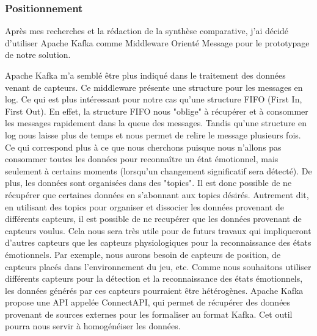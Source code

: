 \documentclass[11pt]{article}
\begin{document}
		\subsubsection{Positionnement}\label{sec:position}
			Après mes recherches et la rédaction de la synthèse comparative, j'ai décidé d'utiliser Apache Kafka comme Middleware Orienté Message pour le prototypage de notre solution.\par
			Apache Kafka m'a semblé être plus indiqué dans le traitement des données venant de capteurs.
			Ce middleware présente une structure pour les messages en log.
			Ce qui est plus intéressant pour notre cas qu'une structure FIFO (First In, First Out).
			En effet, la structure FIFO nous "oblige" à récupérer et à consommer les messages rapidement dans la queue des messages.
			Tandis qu'une structure en log nous laisse plus de temps et nous permet de relire le message plusieurs fois.
			Ce qui correspond plus à ce que nous cherchons puisque nous n'allons pas consommer toutes les données pour reconnaître un état émotionnel, mais seulement à certains moments (lorsqu'un changement significatif sera détecté). 
			De plus, les données sont organisées dans des "topics". 
			Il est donc possible de ne récupérer que certaines données en s'abonnant aux topics désirés.
			Autrement dit, en utilisant des topics pour organiser et dissocier les données provenant de différents capteurs, il est possible de ne recupérer que les données provenant de capteurs voulus.
			Cela nous sera très utile pour de futurs travaux qui impliqueront d'autres capteurs que les capteurs physiologiques pour la reconnaissance des états émotionnels.
			Par exemple, nous aurons besoin de capteurs de position, de capteurs placés dans l'environnement du jeu, etc.
			Comme nous souhaitons utiliser différents capteurs pour la détection et la reconnaissance des états émotionnels, les données générés par ces capteurs pourraient être hétérogènes. 
			Apache Kafka propose une API appelée ConnectAPI, qui permet de récupérer des données provenant de sources externes pour les formaliser au format Kafka.
			Cet outil pourra nous servir à homogénéiser les données.
\end{document}
